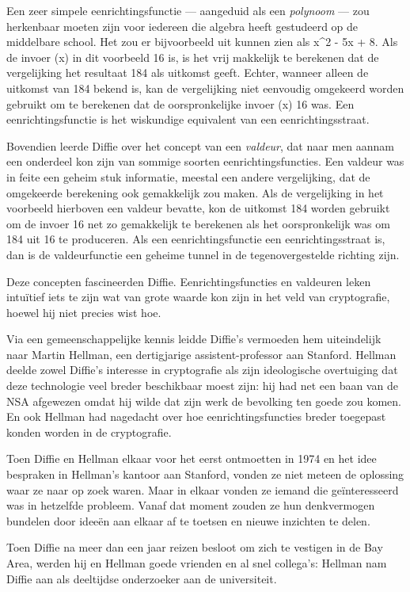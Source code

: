 \documentclass[
  a5paper,
  smalldemyvopaper,11pt,twoside,onecolumn,openright,extrafontsizes]{memoir}
\begin{document}
Een zeer simpele eenrichtingsfunctie --- aangeduid als een
\emph{polynoom} --- zou herkenbaar moeten zijn voor iedereen die algebra
heeft gestudeerd op de middelbare school. Het zou er bijvoorbeeld uit
kunnen zien als x\^{}2 - 5x + 8. Als de invoer (x) in dit voorbeeld 16
is, is het vrij makkelijk te berekenen dat de vergelijking het resultaat
184 als uitkomst geeft. Echter, wanneer alleen de uitkomst van 184
bekend is, kan de vergelijking niet eenvoudig omgekeerd worden gebruikt
om te berekenen dat de oorspronkelijke invoer (x) 16 was. Een
eenrichtingsfunctie is het wiskundige equivalent van een
eenrichtingsstraat.

Bovendien leerde Diffie over het concept van een \emph{valdeur}, dat
naar men aannam een onderdeel kon zijn van sommige soorten
eenrichtingsfuncties. Een valdeur was in feite een geheim stuk
informatie, meestal een andere vergelijking, dat de omgekeerde
berekening ook gemakkelijk zou maken. Als de vergelijking in het
voorbeeld hierboven een valdeur bevatte, kon de uitkomst 184 worden
gebruikt om de invoer 16 net zo gemakkelijk te berekenen als het
oorspronkelijk was om 184 uit 16 te produceren. Als een
eenrichtingsfunctie een eenrichtingsstraat is, dan is de valdeurfunctie
een geheime tunnel in de tegenovergestelde richting zijn.

Deze concepten fascineerden Diffie. Eenrichtingsfuncties en valdeuren
leken intuïtief iets te zijn wat van grote waarde kon zijn in het veld
van cryptografie, hoewel hij niet precies wist hoe.

Via een gemeenschappelijke kennis leidde Diffie's vermoeden hem
uiteindelijk naar Martin Hellman, een dertigjarige assistent-professor
aan Stanford. Hellman deelde zowel Diffie's interesse in cryptografie
als zijn ideologische overtuiging dat deze technologie veel breder
beschikbaar moest zijn: hij had net een baan van de NSA afgewezen omdat
hij wilde dat zijn werk de bevolking ten goede zou komen. En ook Hellman
had nagedacht over hoe eenrichtingsfuncties breder toegepast konden
worden in de cryptografie.

Toen Diffie en Hellman elkaar voor het eerst ontmoetten in 1974 en het
idee bespraken in Hellman's kantoor aan Stanford, vonden ze niet meteen
de oplossing waar ze naar op zoek waren. Maar in elkaar vonden ze iemand
die geïnteresseerd was in hetzelfde probleem. Vanaf dat moment zouden ze
hun denkvermogen bundelen door ideeën aan elkaar af te toetsen en nieuwe
inzichten te delen.

Toen Diffie na meer dan een jaar reizen besloot om zich te vestigen in
de Bay Area, werden hij en Hellman goede vrienden en al snel collega's:
Hellman nam Diffie aan als deeltijdse onderzoeker aan de universiteit.
\end{document}
